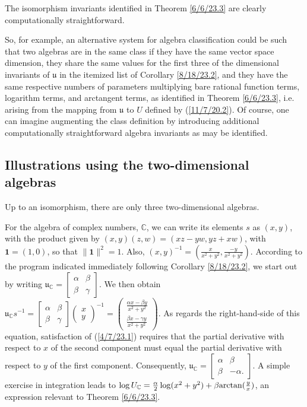 \documentclass{amsart}
\numberwithin{equation}{section}
\theoremstyle{definition}
\numberwithin{theorem}{section}
\begin{document}
The isomorphism invariants identified in  Theorem \ref{6/6/23.3} are clearly computationally straightforward.

So, for example, an alternative system for algebra classification could be such that two algebras are in the same class if they have the same vector space dimension, they share the same values for the first three of the dimensional invariants of $\mathfrak{u}$ in the itemized list of Corollary \ref{8/18/23.2}, and they have the same respective numbers of parameters multiplying bare rational function terms, logarithm terms, and arctangent terms, as identified in Theorem \ref{6/6/23.3}, i.e. arising from the mapping from $\mathfrak{u}$ to $ U$ defined by (\ref{11/7/20.2}).  
Of course, one can imagine augmenting the class definition by introducing additional computationally straightforward algebra invariants as may be identified.  

\subsection{Illustrations using the two-dimensional algebras}
Up to an isomorphism, there are only three two-dimensional algebras.

For the algebra of complex numbers, $\mathbb{C}$, we can write its elements $s$ as $(x,y)$, with the product given by $(x,y)(z,w) = (xz-yw, yz+xw)$, with $\mathbf{1}=(1,0)$, so that $\|\mathbf{1}\|^2=1$.  Also, $(x,y)^{-1} = (\frac{x}{x^2+y^2},\frac{-y}{x^2+y^2})$.  According to the program indicated immediately following Corollary \ref{8/18/23.2}, we start out by writing  $\mathfrak{u}_\mathbb{C} = \left[\begin{array}{ccc}
 \alpha & \beta   \\ 
 \beta & \gamma    
\end{array}\right]$.  We then obtain  $\mathfrak{u}_\mathbb{C}s^{-1} = \left[\begin{array}{ccc}
 \alpha & \beta   \\ 
 \beta & \gamma    
\end{array}\right]\left(\begin{array}{ccc}
x   \\ 
y   
\end{array}\right)^{-1} = \left(\begin{array}{ccc}
\frac{\alpha x - \beta y}{x^2+y^2}  \\ 
\frac{\beta x - \gamma y}{x^2+y^2} 
\end{array}\right)$.  As regards the right-hand-side of this equation, satisfaction of (\ref{4/7/23.1}) requires that the partial derivative with respect to $x$ of the second component must equal the partial derivative with respect to $y$ of the first component.  Consequently, $\mathfrak{u}_{\mathbb{C}} = \left[\begin{array}{ccc}
 \alpha & \beta   \\ 
 \beta & -\alpha.    
\end{array}\right]$.  A simple exercise in integration leads to $\log  U_{\mathbb{C}} = \frac{\alpha}{2}\log(x^2+y^2) + \beta{\rm arctan}(\frac{y}{x})$, an expression relevant to Theorem \ref{6/6/23.3}.
\end{document}
